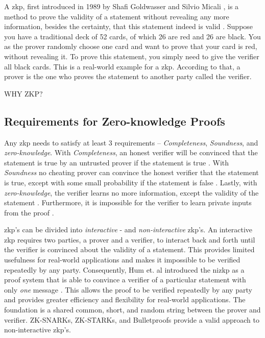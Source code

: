 A \acrfull{zkp}, first introduced in 1989 by Shafi Goldwasser and Silvio Micali \cite{doi:10.1137/0218012}, is a method to prove the validity of a statement without revealing any more information, besides the certainty, that this statement indeed is valid \cite{simunicVerifiableComputingApplications2021}. Suppose you have a traditional deck of 52 cards, of which 26 are red and 26 are black. You as the prover randomly choose one card and want to prove that your card is red, without revealing it. To prove this statement, you simply need to give the verifier all black cards. This is a real-world example for a \acrshort{zkp}. According to that, a prover is the one who proves the statement to another party called the verifier.

WHY ZKP?

\subsection{Requirements for Zero-knowledge Proofs}
\label{subsec:zkp_req}

Any \acrshort{zkp} needs to satisfy at least 3 requirements -- \emph{Completeness}, \emph{Soundness}, and \emph{zero-knowledge}. With \emph{Completeness}, an honest verifier will be convinced that the statement is true by an untrusted prover if the statement is true \cite{simunicVerifiableComputingApplications2021}. With \emph{Soundness} no cheating prover can convince the honest verifier that the statement is true, except with some small probability if the statement is false \cite{simunicVerifiableComputingApplications2021}. Lastly, with \emph{zero-knowledge}, the verifier learns no more information, except the validity of the statement \cite{simunicVerifiableComputingApplications2021}. Furthermore, it is impossible for the verifier to learn private inputs from the proof \cite{simunicVerifiableComputingApplications2021}.

\acrlong{zkp}'s can be divided into \emph{interactive} - and \emph{non-interactive} \acrshort{zkp}'s. An interactive \acrshort{zkp} requires two parties, a prover and a verifier, to interact back and forth until the verifier is convinced about the validity of a statement. This provides limited usefulness for real-world applications and makes it impossible to be verified repeatedly by any party. Consequently, Hum et. al \cite{humZeroKnowledgeItsApplications} introduced the \acrfull{nizkp} as a proof system that is able to convince a verifier of a particular statement with only \emph{one} message \cite{eberhardtOffchainingModelsApproaches2018,eberhardtZoKratesScalablePrivacyPreserving2018a,simunicVerifiableComputingApplications2021}. This allows the proof to be verified repeatedly by any party and provides greater efficiency and flexibility for real-world applications. The foundation is a shared common, short, and random string between the prover and verifier. ZK-SNARKs, ZK-STARKs, and Bulletproofs provide a valid approach to non-interactive \acrshort{zkp}'s.

